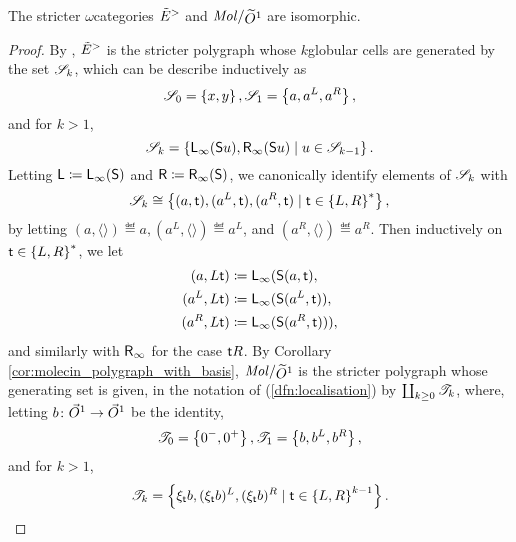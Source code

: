 \begin{lem} \label{lem:swE_is_iso_to_molecin_loc_globe}
    The stricter \( \omega \)\nbd categories \( \tilde E^> \) and \( \molecin{\rglobe{1}} \) are isomorphic.
\end{lem}
\begin{proof}
    By \cite[Remark 1.29]{hadzihasanovic2024model}, \( \tilde E^> \) is the stricter polygraph whose \( k \)\nbd globular cells are
    generated by the set \( \mathscr{S}_k \), which can be describe inductively as
    \begin{equation*}
        \mathscr{S}_0 = \left\{ {x, y} \right\}, \mathscr{S}_1 = \left\{ {a, a^L, a^R} \right\},
    \end{equation*} 
    and for \( k > 1 \),
    \begin{equation*}
        \mathscr{S}_k = \left\{ {\mathsf{L}_\infty(\mathsf{S}{u}), \mathsf{R}_\infty(\mathsf{S}{u}) \mid u \in \mathscr{S}_{k - 1}} \right\}.
    \end{equation*}
    Letting \( \mathsf{L} \coloneqq \mathsf{L}_\infty(\mathsf{S}{}) \) and \( \mathsf{R} \coloneqq \mathsf{R}_\infty(\mathsf{S}{}) \), we canonically identify elements of \( \mathscr{S}_k \)
    with
    \begin{equation*}
        \mathscr{S}_k \cong \left\{ {(a, \mathsf{t}), (a^L, \mathsf{t}), (a^R, \mathsf{t}) \mid \mathsf{t} \in \left\{ {L, R} \right\}^*} \right\},
    \end{equation*}
    by letting \( (a, \langle\rangle) \eqdef a, (a^L, \langle\rangle) \eqdef a^L \), and \( (a^R, \langle\rangle) \eqdef a^R \). 
    Then inductively on \( \mathsf{t} \in \left\{ {L, R} \right\}^* \), we let 
    \begin{align*}
        (a, L\mathsf{t})   & \coloneqq \mathsf{L}_\infty(\mathsf{S}{(a, \mathsf{t})},  \\
        (a^L, L\mathsf{t}) & \coloneqq \mathsf{L}_\infty(\mathsf{S}{(a^L, \mathsf{t})}), \\
        (a^R, L\mathsf{t}) & \coloneqq \mathsf{L}_\infty(\mathsf{S}{(a^R, \mathsf{t})})),
    \end{align*}
    and similarly with \( \mathsf{R}_\infty \) for the case \( \mathsf{t} R \).    
    By Corollary \ref{cor:molecin_polygraph_with_basis}, \( \molecin{\rglobe{1}} \) is the stricter polygraph whose generating set is given, in the notation of (\ref{dfn:localisation}) by \( \coprod_{k \geq 0} \mathscr{T}_k \), where, letting \( b \colon \vec{O}^{1} \to \vec{O}^{1} \) be the identity, 
    \begin{equation*}
        \mathscr{T}_0 = \left\{ {0^-, 0^+} \right\}, \mathscr{T}_1 = \left\{ {b, b^L, b^R} \right\},
    \end{equation*}
    and for \( k > 1 \),
    \begin{equation*}
        \cls{T}_k = \set{\hinv{\s}b, (\hinv{\s}b)^L, (\hinv{\s}b)^R \mid \s \in \set{L, R}^{k - 1}}.

\end{equation*}
\end{proof}

